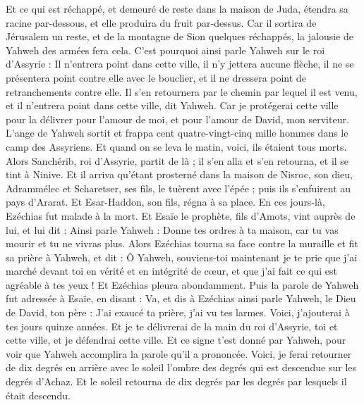 \begin{multicols}{2}
Et ce qui est réchappé, et demeuré de reste dans la maison de Juda, étendra sa racine par-dessous, et elle produira du fruit par-dessus.
Car il sortira de Jérusalem un reste, et de la montagne de Sion quelques réchappés, la jalousie de Yahweh des armées fera cela.
C'est pourquoi ainsi parle Yahweh sur le roi d'Assyrie : Il n'entrera point dans cette ville, il n'y jettera aucune flèche, il ne se présentera point contre elle avec le bouclier, et il ne dressera point de retranchements contre elle.
Il s'en retournera par le chemin par lequel il est venu, et il n'entrera point dans cette ville, dit Yahweh.
Car je protégerai cette ville pour la délivrer pour l'amour de moi, et pour l'amour de David, mon serviteur.
L'ange de Yahweh sortit et frappa cent quatre-vingt-cinq mille hommes dans le camp des Assyriens. Et quand on se leva le matin, voici, ils étaient tous morts.
Alors Sanchérib, roi d'Assyrie, partit de là ; il s'en alla et s'en retourna, et il se tint à Ninive.
Et il arriva qu'étant prosterné dans la maison de Nisroc, son dieu, Adrammélec et Scharetser, ses fils, le tuèrent avec l'épée ; puis ils s'enfuirent au pays d'Ararat. Et Esar-Haddon, son fils, régna à sa place.
\VerseOne{}En ces jours-là, Ezéchias fut malade à la mort. Et Esaïe le prophète, fils d'Amots, vint auprès de lui, et lui dit : Ainsi parle Yahweh : Donne tes ordres à ta maison, car tu vas mourir et tu ne vivras plus.
Alors Ezéchias tourna sa face contre la muraille et fit sa prière à Yahweh,
et dit : Ô Yahweh, souviens-toi maintenant je te prie que j'ai marché devant toi en vérité et en intégrité de cœur, et que j'ai fait ce qui est agréable à tes yeux ! Et Ezéchias pleura abondamment.
Puis la parole de Yahweh fut adressée à Esaïe, en disant :
Va, et dis à Ezéchias ainsi parle Yahweh, le Dieu de David, ton père : J'ai exaucé ta prière, j'ai vu tes larmes. Voici, j'ajouterai à tes jours quinze années.
Et je te délivrerai de la main du roi d'Assyrie, toi et cette ville, et je défendrai cette ville.
Et ce signe t'est donné par Yahweh, pour voir que Yahweh accomplira la parole qu'il a prononcée.
Voici, je ferai retourner de dix degrés en arrière avec le soleil l'ombre des degrés qui est descendue sur les degrés d'Achaz. Et le soleil retourna de dix degrés par les degrés par lesquels il était descendu.

\end{multicols}
